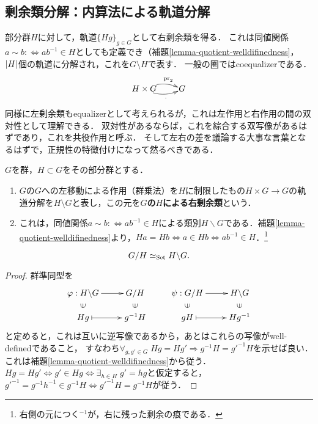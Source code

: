 \documentclass[uplatex,dvipdfmx]{jsreport}
\begin{document}
\subsection{剰余類分解：内算法による軌道分解}

\begin{tcolorbox}[colframe=ForestGreen, colback=ForestGreen!10!white,breakable,colbacktitle=ForestGreen!40!white,coltitle=black,fonttitle=\bfseries\sffamily,
    title=内算法による軌道分解]
    部分群$H$に対して，軌道$\{Hg\}_{g\in G}$として右剰余類を得る．
    これは同値関係$a\sim b:\Leftrightarrow ab^{-1}\in H$としても定義でき（補題\ref{lemma-quotient-welldifinedness}，
    $\lvert H\rvert$個の軌道に分解され，これを$G\setminus H$で表す．
    一般の圏ではcoequalizerである．
    \[\xymatrix@1{
        H\times G\ar@/^/[r]^-{\pr_2}\ar@/_/[r]_-{\cdot}&G
    }\]
    同様に左剰余類もequalizerとして考えられるが，これは左作用と右作用の間の双対性として理解できる．
    双対性があるならば，これを綜合する双写像があるはずであり，これを共役作用と呼ぶ．
    そして左右の差を議論する大事な言葉となるはずで，正規性の特徴付けになって然るべきである．
\end{tcolorbox}

\begin{definition}
    $G$を群，$H\subset G$をその部分群とする．
    \begin{enumerate}
        \item $G$の$G$への左移動による作用（群乗法）を$H$に制限したもの$H\times G\to G$の軌道分解を$H\setminus G$と表し，この元を\textbf{$G$の$H$による右剰余類}という．
        \item これは，同値関係$a\sim b:\Leftrightarrow ab^{-1}\in H$による類別$H\backslash G$である．補題\ref{lemma-quotient-welldifinedness}より，$Ha=Hb\Leftrightarrow a\in Hb\Leftrightarrow ab^{-1}\in H$．\footnote{右側の元につく${}^{-1}$が，右に残った剰余の痕である．}
    \end{enumerate}
\end{definition}

\begin{proposition}[左右双対性]
    \[G/H\simeq_{\mathrm{Set}} H\backslash G.\]
\end{proposition}
\begin{proof}
    群準同型を
    \[\xymatrix@R-2pc{
        \varphi:H\backslash G\ar[r]&G/H&\psi:G/H\ar[r]&H\backslash G\\
        \rotatebox[origin=c]{90}{$\in$}&\rotatebox[origin=c]{90}{$\in$}&\rotatebox[origin=c]{90}{$\in$}&\rotatebox[origin=c]{90}{$\in$}\\
        Hg\ar@{|->}[r]&g^{-1}H&gH\ar@{|->}[r]&Hg^{-1}
    }\]
    と定めると，これは互いに逆写像であるから，あとはこれらの写像がwell-definedであること，
    すなわち$\forall_{g,g'\in G}\;Hg=Hg'\Rightarrow g^{-1}H=g'^{-1}H$を示せば良い．
    これは補題\ref{lemma-quotient-welldifinedness}から従う．
    $Hg=Hg'\Leftrightarrow g'\in Hg\Leftrightarrow \exists_{h\in H}\; g'=hg$と仮定すると，
    $g'^{-1}=g^{-1}h^{-1}\in g^{-1}H\Leftrightarrow g'^{-1}H=g^{-1}H$が従う．
\end{proof}
\end{document}
